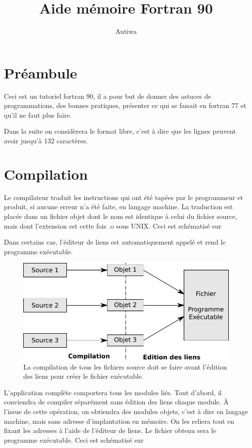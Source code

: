 \documentclass[a4paper,twoside]{article}
\title{Aide mémoire Fortran 90}
\author{Autiwa}
\begin{document}
\tableofcontents

\clearpage

\section{Préambule}
Ceci est un tutoriel fortran 90, il a pour but de donner des astuces de programmations, des bonnes pratiques, présenter ce qui se faisait en fortran 77 et qu'il ne faut plus faire. 

Dans la suite on considèrera le format libre, c'est à dire que les lignes peuvent avoir jusqu'à 132 caractères.

\section{Compilation}
Le compilateur traduit les instructions qui ont été tapées par le programmeur et produit, si aucune erreur n'a été faite, en langage machine. La traduction est placée dans un fichier objet dont le nom est identique à celui du fichier source, mais dont l'extension est cette fois .o sous UNIX. Ceci est schématisé sur 

\begin{attention}
Dans certains cas, l'éditeur de liens est automatiquement appelé et rend le programme exécutable.
\end{attention}

\begin{figure}[htb]
\centering
\includegraphics[width=0.65\linewidth]{figure/compilation.pdf}
\caption{La compilation de tous les fichiers source doit se faire avant l'édition des liens pour créer le fichier exécutable.}\label{fig:compilation}
\end{figure}

L'application complète comportera tous les modules liés. Tout d'abord, il conviendra de compiler séparément sans édition des liens chaque module. À l'issue de cette opération, on obtiendra des modules objets, c'est à dire en langage machine, mais sans adresse d'implantation en mémoire. On les reliera tout en fixant les adresses à l'aide de l'éditeur de liens. Le fichier obtenu sera le programme exécutable. Ceci est schématisé sur 
\end{document}
